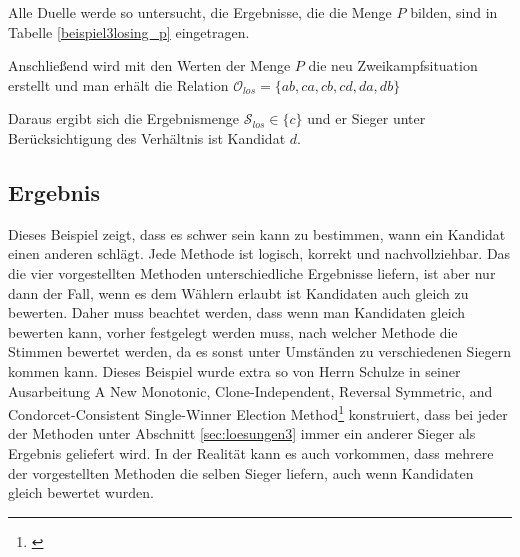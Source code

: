 Alle Duelle werde so untersucht, die Ergebnisse, die die Menge $P$ bilden, sind in Tabelle \ref{beispiel3losing_p} eingetragen.




Anschließend wird mit den Werten der Menge $P$ die neu Zweikampfsituation erstellt und man erhält die Relation $\mathcal{O}_{los} = \{ ab,ca,cb,cd,da,db \}$

Daraus ergibt sich die Ergebnismenge $\mathcal{S}_{los} \in \{c\}$ und er Sieger unter Berücksichtigung des Verhältnis ist Kandidat $d$.

\subsection{Ergebnis} 
\label{sec:ergebnis3}
Dieses Beispiel zeigt, dass es schwer sein kann zu bestimmen, wann ein Kandidat einen anderen schlägt. Jede Methode ist logisch, korrekt und nachvollziehbar. Das die vier vorgestellten Methoden unterschiedliche Ergebnisse liefern, ist aber nur dann der Fall, wenn es dem Wählern erlaubt ist Kandidaten auch gleich zu bewerten. Daher muss beachtet werden, dass wenn man Kandidaten gleich bewerten kann, vorher festgelegt werden muss, nach welcher Methode die Stimmen bewertet werden, da es sonst unter Umständen zu verschiedenen Siegern kommen kann. Dieses Beispiel wurde extra so von Herrn Schulze in seiner Ausarbeitung \glqq A New Monotonic, Clone-Independent,
Reversal Symmetric, and Condorcet-Consistent
Single-Winner Election Method\grqq{}\footnote{\Vgl \citet{Schulze2017}} konstruiert, dass bei jeder der Methoden unter Abschnitt \ref{sec:loesungen3} immer ein anderer Sieger als Ergebnis geliefert wird. In der Realität kann es auch vorkommen, dass mehrere der vorgestellten Methoden die selben Sieger liefern, auch wenn Kandidaten gleich bewertet wurden.
\newpage